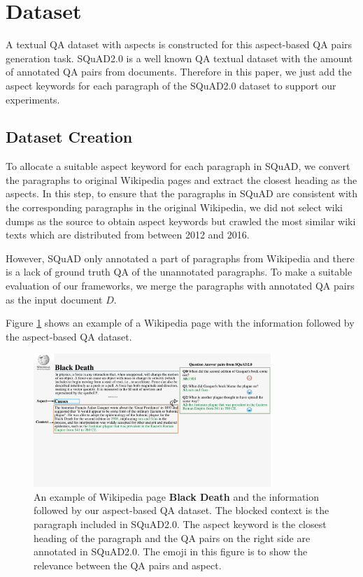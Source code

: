 \section{Dataset}
\label{sec:data}

A textual QA dataset with aspects is constructed for this aspect-based QA pairs generation task. 
SQuAD2.0 is a well known QA textual dataset with the amount of annotated QA pairs from documents.
Therefore in this paper, we just add the aspect keywords for each paragraph of the SQuAD2.0 dataset to support our experiments.

\subsection{Dataset Creation}
To allocate a suitable aspect keyword for each paragraph in SQuAD, we convert the paragraphs to original Wikipedia pages and extract the closest heading as the aspects.
In this step, to ensure that the paragraphs in SQuAD are consistent with the corresponding paragraphs in the original Wikipedia, 
we did not select wiki dumps as the source to obtain aspect keywords but crawled the most similar wiki texts which are distributed from between 2012 and 2016.

However, SQuAD only annotated a part of paragraphs from Wikipedia and there is a lack of ground truth QA of the unannotated paragraphs.
To make a suitable evaluation of our frameworks, we merge the paragraphs with annotated QA pairs as the input document $D$.

Figure \ref{fig:wiki} shows an example of a Wikipedia page with the information followed by the aspect-based QA dataset.

\begin{figure}[th]
    \begin{center}
    \includegraphics[width=0.8\textwidth]{pic/Wikipedia.pdf}
        \caption{\label{fig:wiki} An example of Wikipedia page \textbf{Black Death} and the information followed by our aspect-based QA dataset.
        The blocked context is the paragraph included in SQuAD2.0. The aspect keyword is the closest heading of the paragraph and the QA pairs on the right side are annotated in SQuAD2.0. The emoji in this figure is to show the relevance between the QA pairs and  aspect.}
    \end{center}
\end{figure}

